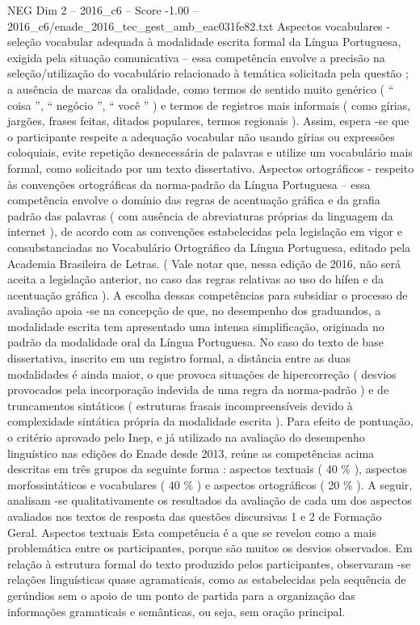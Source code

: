 \begin{textsample}{NEG Dim 2 – 2016\_c6 – Score -1.00 – 2016\_c6/enade\_2016\_tec\_gest\_amb\_eac031fe82.txt}
Aspectos vocabulares - seleção vocabular adequada à modalidade escrita formal da Língua Portuguesa, exigida pela situação comunicativa – essa competência envolve a precisão na seleção/utilização do vocabulário relacionado à temática solicitada pela questão ; a ausência de marcas da oralidade, como termos de sentido muito genérico ( “ coisa ”, “ negócio ”, “ você ” ) e termos de registros mais informais ( como gírias, jargões, frases feitas, ditados populares, termos regionais ).
Assim, espera -se que o participante respeite a adequação vocabular não usando gírias ou expressões coloquiais, evite repetição desnecessária de palavras e utilize um vocabulário mais formal, como solicitado por um texto dissertativo.
Aspectos ortográficos - respeito às convenções ortográficas da norma-padrão da Língua Portuguesa – essa competência envolve o domínio das regras de acentuação gráfica e da grafia padrão das palavras ( com ausência de abreviaturas próprias da linguagem da internet ), de acordo com as convenções estabelecidas pela legislação em vigor e consubstanciadas no Vocabulário Ortográfico da Língua Portuguesa, editado pela Academia Brasileira de Letras. ( Vale notar que, nessa edição de 2016, não será aceita a legislação anterior, no caso das regras relativas ao uso do hífen e da acentuação gráfica ).
A escolha dessas competências para subsidiar o processo de avaliação apoia -se na concepção de que, no desempenho dos graduandos, a modalidade escrita tem apresentado uma intensa simplificação, originada no padrão da modalidade oral da Língua Portuguesa.
No caso do texto de base dissertativa, inscrito em um registro formal, a distância entre as duas modalidades é ainda maior, o que provoca situações de hipercorreção ( desvios provocados pela incorporação indevida de uma regra da norma-padrão ) e de truncamentos sintáticos ( estruturas frasais incompreensíveis devido à complexidade sintática própria da modalidade escrita ).
Para efeito de pontuação, o critério aprovado pelo Inep, e já utilizado na avaliação do desempenho linguístico nas edições do Enade desde 2013, reúne as competências acima descritas em três grupos da seguinte forma : aspectos textuais ( 40 \% ), aspectos morfossintáticos e vocabulares ( 40 \% ) e aspectos ortográficos ( 20 \% ).
A seguir, analisam -se qualitativamente os resultados da avaliação de cada um dos aspectos avaliados nos textos de resposta das questões discursivas 1 e 2 de Formação Geral.
Aspectos textuais Esta competência é a que se revelou como a mais problemática entre os participantes, porque são muitos os desvios observados.
Em relação à estrutura formal do texto produzido pelos participantes, observaram -se relações linguísticas quase agramaticais, como as estabelecidas pela sequência de gerúndios sem o apoio de um ponto de partida para a organização das informações gramaticais e semânticas, ou seja, sem oração principal.

\end{textsample}
